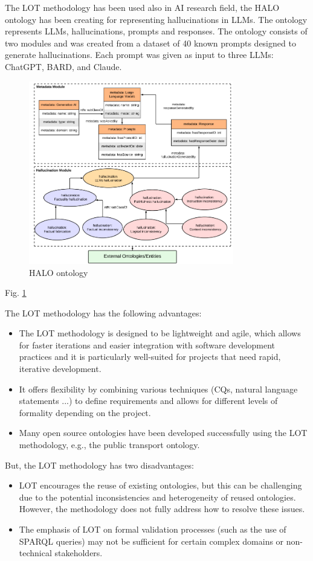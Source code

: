 The LOT methodology has been used also in AI research field, the HALO ontology \cite{nananukul2024halo} has been creating for representing hallucinations in LLMs.
The ontology represents LLMs, hallucinations, prompts and responses.
The ontology consists of two modules and was created from a dataset of 40 known prompts designed to generate hallucinations.
Each prompt was given as input to three LLMs: ChatGPT, BARD, and Claude.
\begin{figure}[H]
    \centering
    \includegraphics[width=0.7\linewidth, height=8cm]{Figures/fig_4.png}
    \caption{HALO ontology}
    \label{fig:halo}
\end{figure}
Fig. \ref{fig:halo}

The LOT methodology has the following advantages:
\begin{itemize}
    \item The LOT methodology is designed to be lightweight and agile, which allows for faster iterations and easier integration with software development practices and it is particularly well-suited for projects that need rapid, iterative development.

    \item It offers flexibility by combining various techniques (CQs, natural language statements ...) to define requirements and allows for different levels of formality depending on the project.

    \item Many open source ontologies have been developed successfully using the LOT methodology, e.g., the public transport ontology.
\end{itemize}
But, the LOT methodology has two disadvantages:
\begin{itemize}
    \item LOT encourages the reuse of existing ontologies, but this can be challenging due to the potential inconsistencies and heterogeneity of reused ontologies. However, the methodology does not fully address how to resolve these issues.

    \item The emphasis of LOT on formal validation processes (such as the use of SPARQL queries) may not be sufficient for certain complex domains or non-technical stakeholders.
\end{itemize}

